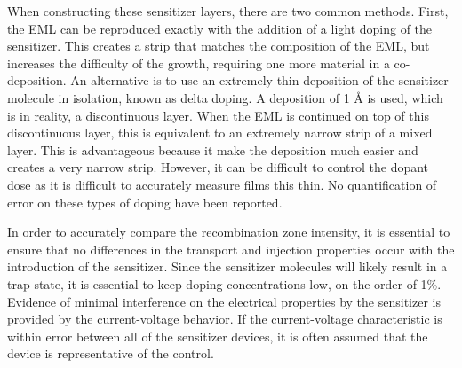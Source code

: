 \documentclass[../thesis.tex]{subfiles}
\begin{document}
When constructing these sensitizer layers, there are two common methods.  
First, the EML can be reproduced exactly with the addition of a light doping of the sensitizer.  
This creates a strip that matches the composition of the EML, but increases the difficulty of the growth, requiring one more material in a co-deposition.
An alternative is to use an extremely thin deposition of the sensitizer molecule in isolation, known as delta doping.
A deposition of 1 \r{A} is used, which is in reality, a discontinuous layer.
When the EML is continued on top of this discontinuous layer, this is equivalent to an extremely narrow strip of a mixed layer.
This is advantageous because it make the deposition much easier and creates a very narrow strip.
However, it can be difficult to control the dopant dose as it is difficult to accurately measure films this thin. 
No quantification of error on these types of doping have been reported.

In order to accurately compare the recombination zone intensity, it is essential to ensure that no differences in the transport and injection properties occur with the introduction of the sensitizer.
Since the sensitizer molecules will likely result in a trap state, it is essential to keep doping concentrations low, on the order of 1\%.
Evidence of minimal interference on the electrical properties by the sensitizer is provided by the current-voltage behavior.
If the current-voltage characteristic is within error between all of the sensitizer devices, it is often assumed that the device is representative of the control.\supercite{Erickson2013a}
\end{document}
